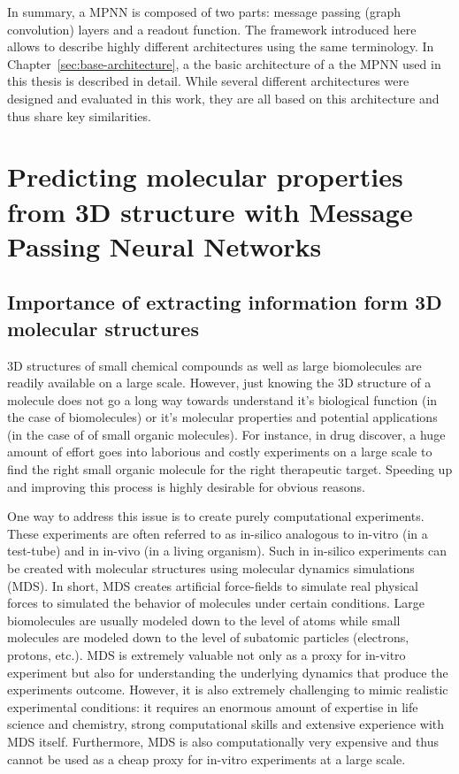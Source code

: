 In summary, a MPNN is composed of two parts: message passing (graph convolution) layers and a readout function. The framework introduced here allows to describe highly different architectures using the same terminology. In Chapter~\ref{sec:base-architecture}, a the basic architecture of a the MPNN used in this thesis is described in detail. While several different architectures were designed and evaluated in this work, they are all based on this architecture and thus share key similarities.


\section{Predicting molecular properties from 3D structure with Message Passing Neural Networks}
\label{3d-molecules-for-gcnns}

\subsection{Importance of extracting information form 3D molecular structures}

3D structures of small chemical compounds as well as large biomolecules are readily available on a large scale.
However, just knowing the 3D structure of a molecule does not go a long way towards understand it's biological function (in the case of biomolecules) or it's molecular properties and potential applications (in the case of of small organic molecules). For instance, in drug discover, a huge amount of effort goes into laborious and costly experiments on a large scale to find the right small organic molecule for the right therapeutic target. Speeding up and improving this process is highly desirable for obvious reasons.

One way to address this issue is to create purely computational experiments. These experiments are often referred to as in-silico analogous to in-vitro (in a test-tube) and in in-vivo (in a living organism). Such in in-silico experiments can be created with molecular structures using molecular dynamics simulations (MDS). In short, MDS creates artificial force-fields to simulate real physical forces to simulated the behavior of molecules under certain conditions. Large biomolecules are usually modeled down to the level of atoms while small molecules are modeled down to the level of subatomic particles (electrons, protons, etc.). MDS is extremely valuable not only as a proxy for in-vitro experiment but also for understanding the underlying dynamics that produce the experiments outcome. However, it is also extremely challenging to mimic realistic experimental conditions: it requires an enormous amount of expertise in life science and chemistry, strong computational skills and extensive experience with MDS itself. Furthermore, MDS is also computationally very expensive and thus cannot be used as a cheap proxy for in-vitro experiments at a large scale.

